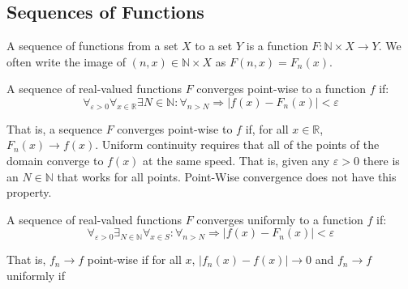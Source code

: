 \documentclass[crop=false,class=book,oneside]{standalone}
\begin{document}
        \subsection{Sequences of Functions}
            \begin{definition}
                    A sequence of functions from a
                    set $X$ to a set $Y$ is a function
                    $F:\mathbb{N}\times{X}\rightarrow{Y}$.
                    We often write the image of
                    $(n,x)\in\mathbb{N}\times{X}$ as
                    $F(n,x)=F_{n}(x)$.
                \end{definition}
            \begin{definition}
                    A sequence of real-valued functions
                    $F$ converges point-wise to a function
                    $f$ if:
                    \begin{equation*}
                        \forall_{\varepsilon>0}
                        \forall_{x\in\mathbb{R}}
                        \exists{N\in\mathbb{N}}:
                        \forall_{n>N}\Rightarrow
                        |f(x)-F_{n}(x)|<\varepsilon
                    \end{equation*}
                \end{definition}
            That is, a sequence $F$ converges point-wise
            to $f$ if, for all $x\in\mathbb{R}$,
            $F_{n}(x)\rightarrow{f(x)}$.
            Uniform continuity requires that all of the
            points of the domain converge to $f(x)$ at
            the same speed. That is, given any $\varepsilon>0$
            there is an $N\in\mathbb{N}$ that works for
            all points. Point-Wise convergence does not
            have this property.
            \begin{definition}
                A sequence of real-valued functions $F$
                converges uniformly to a function
                $f$ if:
                \begin{equation*}
                    \forall_{\varepsilon>0}
                    \exists_{N\in\mathbb{N}}
                    \forall_{x\in{S}}:\forall_{n>N}
                    \Rightarrow
                    |f(x)-F_{n}(x)|<\varepsilon
                \end{equation*}
            \end{definition}
            That is, $f_{n}\rightarrow{f}$
            point-wise if for all $x$,
            $|f_{n}(x)-f(x)|\rightarrow{0}$ and
            $f_{n}\rightarrow{f}$ uniformly if
\end{document}
